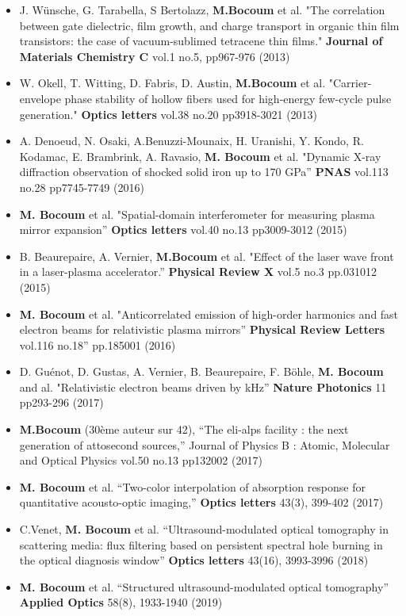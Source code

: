 \documentclass[10pt,a4paper,sans]{moderncv} %
\begin{document}
\begin{itemize}
\item J. Wünsche, G. Tarabella, S Bertolazz, \textbf{M.Bocoum} et al. "The correlation between gate dielectric, film growth, and charge transport in organic thin film transistors: the case of vacuum-sublimed tetracene thin films."  \textbf{Journal of Materials Chemistry C}  vol.1 no.5, pp967-976  (2013) 

\item W. Okell, T. Witting, D. Fabris, D. Austin, \textbf{M.Bocoum} et al. "Carrier-envelope phase stability of hollow fibers used for high-energy few-cycle pulse generation." \textbf{Optics letters} vol.38 no.20 pp3918-3021 (2013)

\item A. Denoeud, N. Osaki, A.Benuzzi-Mounaix, H. Uranishi, Y. Kondo, R. Kodamac, E. Brambrink, A. Ravasio, \textbf{M. Bocoum} et al. "Dynamic X-ray diffraction observation of shocked solid iron up to 170 GPa” \textbf{PNAS} vol.113 no.28 pp7745-7749 (2016)

\item \textbf{M. Bocoum} et al. "Spatial-domain interferometer for measuring plasma mirror expansion” \textbf{Optics letters} vol.40 no.13 pp3009-3012 (2015)

\item B. Beaurepaire, A. Vernier, \textbf{M.Bocoum} et al. "Effect of the laser wave front in a laser-plasma accelerator.” \textbf{Physical Review X} vol.5 no.3 pp.031012 (2015)

\item \textbf{M. Bocoum} et al. "Anticorrelated emission of high-order harmonics and fast electron beams for relativistic plasma mirrors”  \textbf{Physical Review Letters} vol.116 no.18” pp.185001  (2016)

\item  D. Guénot, D. Gustas, A. Vernier, B. Beaurepaire, F. Böhle, \textbf{M. Bocoum} and al. "Relativistic electron beams driven by kHz” \textbf{Nature Photonics} 11 pp293-296 (2017)

\item \textbf{M.Bocoum} (30ème auteur sur 42), “The eli-alps facility : the next generation of attosecond sources,” Journal of Physics B : Atomic, Molecular and Optical Physics vol.50 no.13 pp132002 (2017)

\item  \textbf{M. Bocoum} et al. “Two-color interpolation of absorption response for quantitative acousto-optic imaging,” \textbf{Optics letters} 43(3), 399-402 (2017)

\item  C.Venet, \textbf{M. Bocoum} et al. “Ultrasound-modulated optical tomography in scattering media: flux filtering based on persistent spectral hole burning in the optical diagnosis window” \textbf{Optics letters} 43(16), 3993-3996 (2018)

\item  \textbf{M. Bocoum} et al. “Structured ultrasound-modulated optical tomography” \textbf{Applied Optics} 58(8), 1933-1940 (2019)



\end{itemize}


\end{document}
